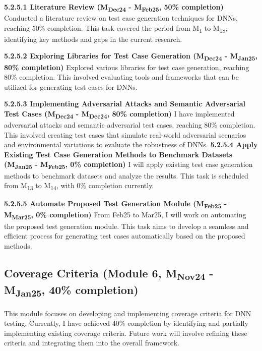 \noindent \textbf{5.2.5.1 Literature Review (M\textsubscript{Dec24} - M\textsubscript{Feb25}, 50\% completion)} Conducted a literature review on test case generation techniques for DNNs, reaching 50\% completion. This task covered the period from M\textsubscript{1} to M\textsubscript{18}, identifying key methods and gaps in the current research.

\noindent \textbf{5.2.5.2 Exploring Libraries for Test Case Generation (M\textsubscript{Dec24} - M\textsubscript{Jan25}, 80\% completion)} Explored various libraries for test case generation, reaching 80\% completion. This involved evaluating tools and frameworks that can be utilized for generating test cases for DNNs.

\noindent \textbf{5.2.5.3 Implementing Adversarial Attacks and Semantic Adversarial Test Cases (M\textsubscript{Dec24} - M\textsubscript{Dec24}, 80\% completion)} I have implemented adversarial attacks and semantic adversarial test cases, reaching 80\% completion. This involved creating test cases that simulate real-world adversarial scenarios and environmental variations to evaluate the robustness of DNNs.
\noindent \textbf{5.2.5.4 Apply Existing Test Case Generation Methods to Benchmark Datasets (M\textsubscript{Jan25} - M\textsubscript{Feb25}, 0\% completion)} I will apply existing test case generation methods to benchmark datasets and analyze the results. This task is scheduled from M\textsubscript{13} to M\textsubscript{14}, with 0\% completion currently.

\noindent \textbf{5.2.5.5 Automate Proposed Test Generation Module (M\textsubscript{Feb25} - M\textsubscript{Mar25}, 0\% completion)} From Feb25 to Mar25, I will work on automating the proposed test generation module. This task aims to develop a seamless and efficient process for generating test cases automatically based on the proposed methods.

\subsection{Coverage Criteria (Module 6, M\textsubscript{Nov24} - M\textsubscript{Jan25}, 40\% completion)} This module focuses on developing and implementing coverage criteria for DNN testing. Currently, I have achieved 40\% completion by identifying and partially implementing existing coverage criteria. Future work will involve refining these criteria and integrating them into the overall framework.



